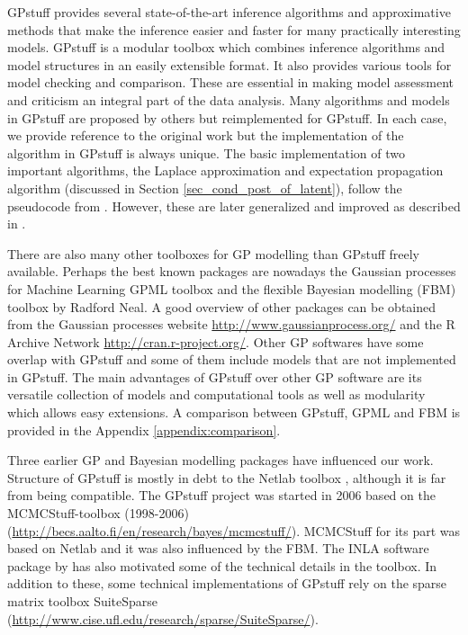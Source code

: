 \documentclass[twoside,11pt]{article}
\newcommand{\pkg}[1]{{\fontseries{b}\selectfont #1}}
\newcommand{\proglang}{}
\begin{document}
\pkg{GPstuff} provides several state-of-the-art inference algorithms
and approximative methods that make the inference easier and faster
for many practically interesting models. \pkg{GPstuff} is a modular
toolbox which combines inference algorithms and model structures in an
easily extensible format. %
It also provides various tools for model checking and comparison.
These are essential in making model assessment and criticism an
integral part of the data analysis. Many algorithms and models in
\pkg{GPstuff} are proposed by others but reimplemented for
\pkg{GPstuff}. In each case, we provide reference to the original work
but the implementation of the algorithm in \pkg{GPstuff} is always
unique. The basic implementation of two important algorithms, the
Laplace approximation and expectation propagation algorithm (discussed
in Section \ref{sec_cond_post_of_latent}), follow the pseudocode from
\citep{Rasmussen+Williams:2006}. However, these are later generalized
and improved as described in
\citep{Vanhatalo+Jylanki+Vehtari:2009,Vanhatalo+Pietilainen+Vehtari:2010,
  Vanhatalo+Vehtari:2010,Jylanki+Vanhatalo+Vehtari:2011,Riihimaki+Jylanki+Vehtari:2013,Riihimaki+Vehtari:2014}.

There are also many other toolboxes for GP modelling than
\pkg{GPstuff} freely available. Perhaps the best known packages are
nowadays the Gaussian processes for Machine Learning \pkg{GPML}
toolbox \citep{Rasmussen+Nickisch:2010} and the flexible Bayesian
modelling (\pkg{FBM}) toolbox by Radford Neal. A good overview of
other packages can be obtained from the Gaussian processes website
\url{http://www.gaussianprocess.org/} and the \proglang{R} Archive
Network \url{http://cran.r-project.org/}.  Other GP softwares have
some overlap with \pkg{GPstuff} and some of them include models that
are not implemented in \pkg{GPstuff}.  The main advantages of
\pkg{GPstuff} over other GP software are its versatile collection of
models and computational tools as well as modularity which allows easy
extensions. A comparison between \pkg{GPstuff}, \pkg{GPML} and
\pkg{FBM} is provided in the Appendix \ref{appendix:comparison}.

Three earlier GP and Bayesian modelling packages have influenced our
work.  Structure of \pkg{GPstuff} is mostly in debt to the
\pkg{Netlab} toolbox \citep{Nabney:2001}, although it is far from
being compatible.  The \pkg{GPstuff} project was started in 2006 based on
the \pkg{MCMCStuff}-toolbox (1998-2006)
(\url{http://becs.aalto.fi/en/research/bayes/mcmcstuff/}). \pkg{MCMCStuff}
for its part was based on \pkg{Netlab} and it was also influenced by
the \pkg{FBM}. The \pkg{INLA} software package by
\citet{Rue+Martino+Chopin:2009} has also motivated some of the
technical details in the toolbox. In addition to these, some technical
implementations of \pkg{GPstuff} rely on the sparse matrix toolbox
\pkg{SuiteSparse} \citep{Davis:2005}
(\url{http://www.cise.ufl.edu/research/sparse/SuiteSparse/}).
\end{document}
